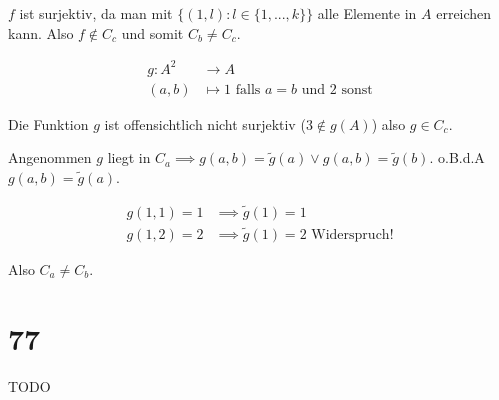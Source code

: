 \documentclass[]{article}
\begin{document}
$f$ ist surjektiv, da man mit $\{(1, l): l \in \{1, ..., k\}\}$ alle Elemente in $A$ erreichen kann. Also $f \notin C_c$ und somit $C_b \neq C_c$.


\begin{align*}
	g:A^2 &\rightarrow A\\
	(a, b) &\mapsto 1 \text{ falls } a=b \text{ und } 2 \text{ sonst}
\end{align*}

Die Funktion $g$ ist offensichtlich nicht surjektiv ($3 \notin g(A)$) also $g \in C_c$.

Angenommen $g$ liegt in $C_a \implies g(a,b)=\tilde{g}(a) \lor g(a,b)=\tilde{g}(b)$. o.B.d.A $g(a,b)=\tilde{g}(a)$.

\begin{align*}
	g(1, 1) = 1 &\implies \tilde{g}(1) = 1\\
	g(1, 2) = 2 &\implies \tilde{g}(1) = 2 \text{ Widerspruch!}
\end{align*}

Also $C_a \neq C_b$.

\section{77}
TODO
\newpage
\end{document}
